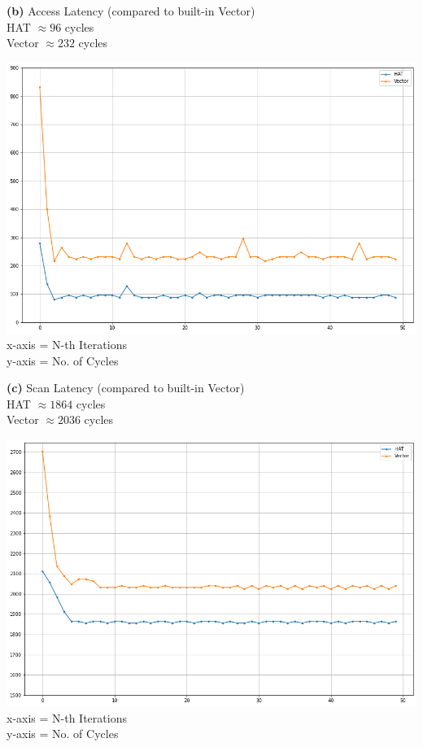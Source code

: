 \documentclass[a4paper, 11pt]{article}
\renewcommand{\part}[1] {\vspace{.10in} {\bf (#1)}}
\begin{document}
\part{b} Access Latency (compared to built-in Vector) \\
HAT $\approx 96$ cycles \\
Vector $\approx 232$ cycles
\begin{center}
  \includegraphics[width=15cm]{p1b}
  x-axis = N-th Iterations\\
  y-axis = No. of Cycles
\end{center}

\part{c} Scan Latency (compared to built-in Vector) \\
HAT $\approx 1864$ cycles \\
Vector $\approx 2036$ cycles
\begin{center}
  \includegraphics[width=15cm]{p1c}
  x-axis = N-th Iterations\\
  y-axis = No. of Cycles
\end{center}
\end{document}

